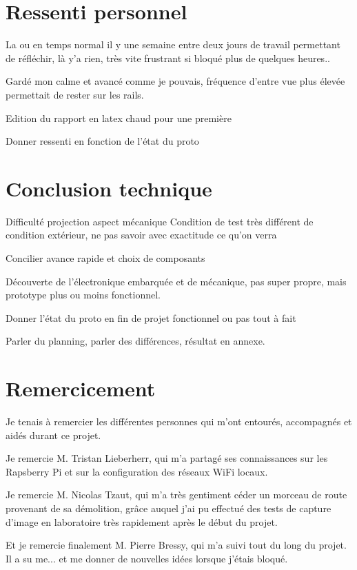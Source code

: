 \section{Ressenti personnel}
La ou en temps normal il y une semaine entre deux jours de travail permettant de réfléchir, là y'a rien, très vite frustrant si bloqué plus de quelques heures..

Gardé mon calme et avancé comme je pouvais, fréquence d'entre vue plus élevée permettait de rester sur les rails.

Edition du rapport en latex chaud pour une première

Donner ressenti en fonction de l'état du proto
\section{Conclusion technique}
Difficulté projection aspect mécanique
Condition de test très différent de condition extérieur, ne pas savoir avec exactitude ce qu'on verra

Concilier avance rapide et choix de composants

Découverte de l'électronique embarquée et de mécanique, pas super propre, mais prototype plus ou moins fonctionnel.

Donner l'état du proto en fin de projet fonctionnel ou pas tout à fait

Parler du planning, parler des différences, résultat en annexe.
\section{Remercicement}
Je tenais à remercier les différentes personnes qui m'ont entourés, accompagnés et aidés durant ce projet.

Je remercie M. Tristan Lieberherr, qui m'a partagé ses connaissances sur les Rapsberry Pi et sur la configuration des réseaux WiFi locaux.

Je remercie M. Nicolas Tzaut, qui m'a très gentiment céder un morceau de route provenant de sa démolition, grâce auquel j'ai pu effectué
des tests de capture d'image en laboratoire très rapidement après le début du projet.

Et je remercie finalement M. Pierre Bressy, qui m'a suivi tout du long du projet. Il a su me... et me donner de nouvelles idées lorsque
j'étais bloqué.
\vfil
\hspace{8cm}\makeatletter\@author\makeatother\par
\hspace{8cm}\begin{minipage}{5cm}
    \printsignature
\end{minipage}

